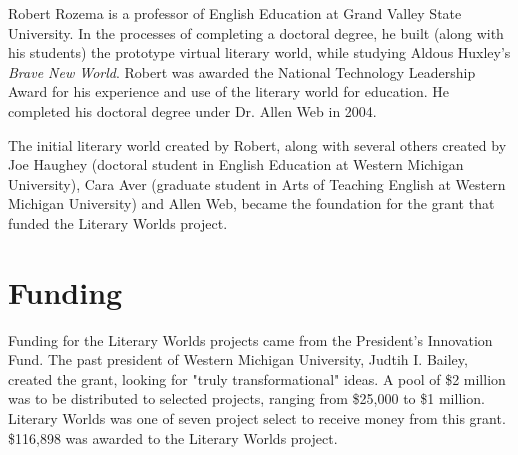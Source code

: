 \documentclass[12pt, letterpaper]{report}
\begin{document}
\par
Robert Rozema is a professor of English Education at Grand Valley State University.  In the processes of completing a doctoral degree, he built (along with his students) the prototype virtual literary world, while studying Aldous Huxley's \textit{Brave New World}. Robert was awarded the National Technology Leadership Award for his experience and use of the literary world for education.  He completed his doctoral degree under Dr. Allen Web in 2004.

\par
The initial literary world created by Robert, along with several others created by Joe Haughey (doctoral student in English Education at Western Michigan University), Cara Aver (graduate student in Arts of Teaching English at Western Michigan University) and Allen Web, became the foundation for the grant that funded the Literary Worlds project. \cite{VirtWorldsTech}

\section{Funding}
\par
Funding for the Literary Worlds projects came from the President's Innovation Fund.  The past president of Western Michigan University, Judtih I. Bailey, created the grant, looking for "truly transformational" ideas. A pool of \$2 million was to be distributed to selected projects, ranging from \$25,000 to \$1 million. Literary Worlds was one of seven project select to receive money from this grant. \$116,898 was awarded to the Literary Worlds project. \cite{VirtWorldsTech}
\end{document}

